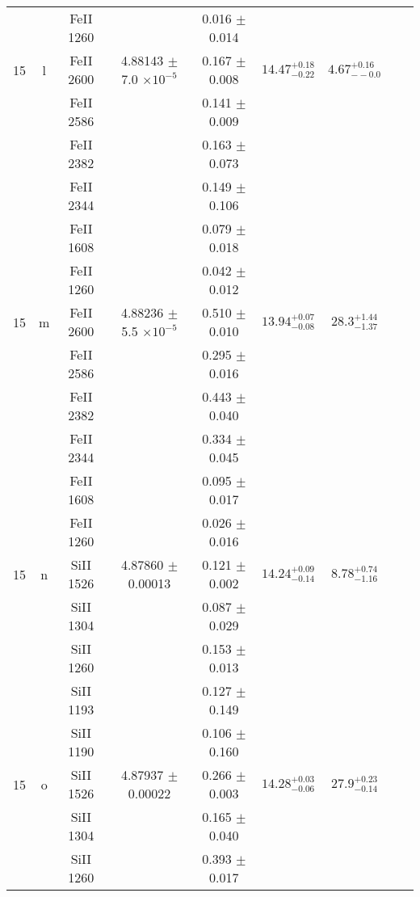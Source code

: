 \documentclass[12pt]{article}
\begin{document}
\begin{footnotesize}
\begin{longtable}{ c c c c c c c c c}
  &   & FeII     1260  &  &  0.016 $\pm$ 0.014   &   &     & 	 & \\ 
      15  & l  & FeII     2600  &  4.88143 $\pm$ 7.0 $\times 10^{-5}$   &  0.167 $\pm$ 0.008   & $14.47_{ - 0.22}^{ + 0.18}$  & $4.67_{ - -0.0}^{ + 0.16}$    & 	 & \\ 
  &   & FeII     2586  &  &  0.141 $\pm$ 0.009   &   &     & 	 & \\ 
  &   & FeII     2382  &  &  0.163 $\pm$ 0.073   &   &     & 	 & \\ 
  &   & FeII     2344  &  &  0.149 $\pm$ 0.106   &   &     & 	 & \\ 
  &   & FeII     1608  &  &  0.079 $\pm$ 0.018   &   &     & 	 & \\ 
  &   & FeII     1260  &  &  0.042 $\pm$ 0.012   &   &     & 	 & \\ 
      15  & m  & FeII     2600  &  4.88236 $\pm$ 5.5 $\times 10^{-5}$   &  0.510 $\pm$ 0.010   & $13.94_{ - 0.08}^{ + 0.07}$  & $28.3_{ - 1.37}^{ + 1.44}$    & 	 & \\ 
  &   & FeII     2586  &  &  0.295 $\pm$ 0.016   &   &     & 	 & \\ 
  &   & FeII     2382  &  &  0.443 $\pm$ 0.040   &   &     & 	 & \\ 
  &   & FeII     2344  &  &  0.334 $\pm$ 0.045   &   &     & 	 & \\ 
  &   & FeII     1608  &  &  0.095 $\pm$ 0.017   &   &     & 	 & \\ 
  &   & FeII     1260  &  &  0.026 $\pm$ 0.016   &   &     & 	 & \\ 
      15  & n  & SiII     1526  &  4.87860 $\pm$ 0.00013  &  0.121 $\pm$ 0.002   & $14.24_{ - 0.14}^{ + 0.09}$  & $8.78_{ - 1.16}^{ + 0.74}$    & 	 & \\ 
  &   & SiII     1304  &  &  0.087 $\pm$ 0.029   &   &     & 	 & \\ 
  &   & SiII     1260  &  &  0.153 $\pm$ 0.013   &   &     & 	 & \\ 
  &   & SiII     1193  &  &  0.127 $\pm$ 0.149   &   &     & 	 & \\ 
  &   & SiII     1190  &  &  0.106 $\pm$ 0.160   &   &     & 	 & \\ 
      15  & o  & SiII     1526  &  4.87937 $\pm$ 0.00022  &  0.266 $\pm$ 0.003   & $14.28_{ - 0.06}^{ + 0.03}$  & $27.9_{ - 0.14}^{ + 0.23}$    & 	 & \\ 
  &   & SiII     1304  &  &  0.165 $\pm$ 0.040   &   &     & 	 & \\ 
  &   & SiII     1260  &  &  0.393 $\pm$ 0.017   &   &     & 	 & \\ 

\end{longtable}
\end{footnotesize}
\end{document}
